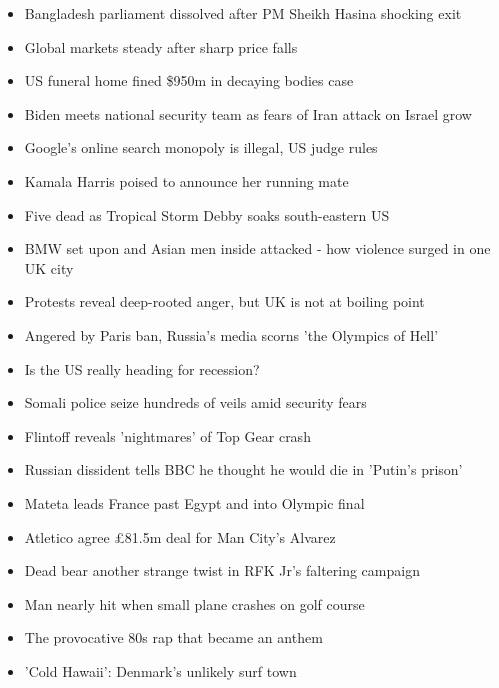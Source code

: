 \documentclass[manuscript]{clv3}
\begin{document}
 \label{appendix}
\begin{itemize}
    \item Bangladesh parliament dissolved after PM Sheikh Hasina shocking exit
    \item Global markets steady after sharp price falls
    \item US funeral home fined \$950m in decaying bodies case
    \item Biden meets national security team as fears of Iran attack on Israel grow
    \item Google's online search monopoly is illegal, US judge rules
    \item Kamala Harris poised to announce her running mate
    \item Five dead as Tropical Storm Debby soaks south-eastern US
    \item BMW set upon and Asian men inside attacked - how violence surged in one UK city
    \item Protests reveal deep-rooted anger, but UK is not at boiling point
    \item Angered by Paris ban, Russia's media scorns 'the Olympics of Hell'
    \item Is the US really heading for recession?
    \item Somali police seize hundreds of veils amid security fears
    \item Flintoff reveals 'nightmares' of Top Gear crash
    \item Russian dissident tells BBC he thought he would die in 'Putin's prison'
    \item Mateta leads France past Egypt and into Olympic final
    \item Atletico agree £81.5m deal for Man City's Alvarez
    \item Dead bear another strange twist in RFK Jr's faltering campaign
    \item Man nearly hit when small plane crashes on golf course
    \item The provocative 80s rap that became an anthem
    \item 'Cold Hawaii': Denmark's unlikely surf town
\end{itemize}
\end{document}

